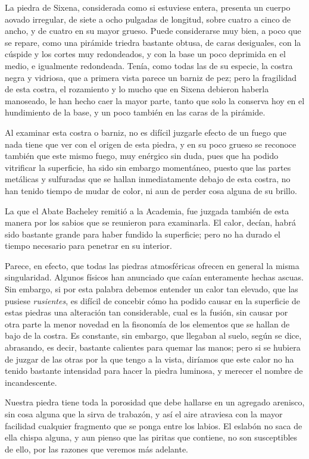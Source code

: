 \documentclass[a4paper, 12pt, oneside, spanish]{article}
\begin{document}
La piedra de Sixena, considerada como si estuviese entera, presenta un cuerpo aovado irregular, de siete a ocho pulgadas de longitud, sobre cuatro a cinco de ancho, y de cuatro en su mayor grueso. Puede considerarse muy bien, a poco que se repare, como una pirámide triedra bastante obtusa, de caras desiguales, con la cúspide y los cortes muy redondeados, y con la base un poco deprimida en el medio, e igualmente redondeada. Tenía, como todas las de su especie, la costra negra y vidriosa, que a primera vista parece un barniz de pez; pero la fragilidad de esta costra, el rozamiento y lo mucho que en Sixena debieron haberla manoseado, le han hecho caer la mayor parte, tanto que solo la conserva hoy en el hundimiento de la base, y un poco también en las caras de la pirámide.

Al examinar esta costra o barniz, no es difícil juzgarle efecto de un fuego que nada tiene que ver con el origen de esta piedra, y en su poco grueso se reconoce también que este mismo fuego, muy enérgico sin duda, pues que ha podido vitrificar la superficie, ha sido sin embargo momentáneo, puesto que las partes metálicas y sulfuradas que se hallan inmediatamente debajo de esta costra, no han tenido tiempo de mudar de color, ni aun de perder cosa alguna de su brillo.

La que el Abate Bacheley remitió a la Academia, fue juzgada también de esta manera por los sabios que se reunieron para examinarla. El calor, decían, habrá sido bastante grande para haber fundido la superficie; pero no ha durado el tiempo necesario para penetrar en su interior.

Parece, en efecto, que todas las piedras atmosféricas ofrecen en general la misma singularidad. Algunos físicos han anunciado que caían enteramente hechas ascuas. Sin embargo, si por esta palabra debemos entender un calor tan elevado, que las pusiese \emph{rusientes}, es difícil de concebir cómo ha podido causar en la superficie de estas piedras una alteración tan considerable, cual es la fusión, sin causar por otra parte la menor novedad en la fisonomía de los elementos que se hallan de bajo de la costra. Es constante, sin embargo, que llegaban al suelo, según se dice, abrasando, es decir, bastante calientes para quemar las manos; pero si se hubiera de juzgar de las otras por la que tengo a la vista, diríamos que este calor no ha tenido bastante intensidad para hacer la piedra luminosa, y merecer el nombre de incandescente.

Nuestra piedra tiene toda la porosidad que debe hallarse en un agregado arenisco, sin cosa alguna que la sirva de trabazón, y así el aire atraviesa con la mayor facilidad cualquier fragmento que se ponga entre los labios. El eslabón no saca de ella chispa alguna, y aun pienso que las piritas que contiene, no son susceptibles de ello, por las razones que veremos más adelante.
\end{document}
